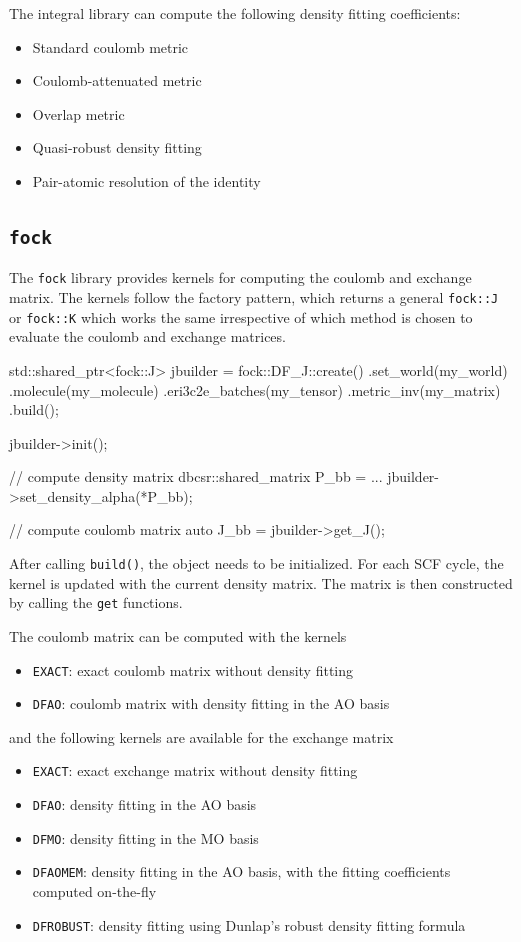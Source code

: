 The integral library can compute the following density fitting coefficients:
\begin{itemize}
\item Standard coulomb metric
\item Coulomb-attenuated metric
\item Overlap metric
\item Quasi-robust density fitting
\item Pair-atomic resolution of the identity
\end{itemize}

\subsection{\texttt{fock}}

The \texttt{fock} library provides kernels for computing the coulomb and exchange matrix. The kernels follow the factory pattern, which returns a general \texttt{fock::J} or \texttt{fock::K} which works the same irrespective of which method is chosen to evaluate the coulomb and exchange matrices.
\begin{cppinline}
std::shared_ptr<fock::J> 
jbuilder = fock::DF_J::create()
	.set_world(my_world)
	.molecule(my_molecule)
	.eri3c2e_batches(my_tensor)
	.metric_inv(my_matrix)
	.build();
	
jbuilder->init();

// compute density matrix 
dbcsr::shared_matrix P_bb = ...
jbuilder->set_density_alpha(*P_bb);

// compute coulomb matrix
auto J_bb = jbuilder->get_J();
\end{cppinline} 
\noindent After calling \texttt{build()}, the object needs to be initialized. For each SCF cycle, the kernel is updated with the current density matrix. The matrix is then constructed by calling the \texttt{get} functions.

The coulomb matrix can be computed with the kernels
\begin{itemize}
\item \texttt{EXACT}: exact coulomb matrix without density fitting
\item \texttt{DFAO}: coulomb matrix with density fitting in the AO basis
\end{itemize}
\noindent and the following kernels are available for the exchange matrix
\begin{itemize}
\item \texttt{EXACT}: exact exchange matrix without density fitting
\item \texttt{DFAO}: density fitting in the AO basis
\item \texttt{DFMO}: density fitting in the MO basis
\item \texttt{DFAOMEM}: density fitting in the AO basis, with the fitting coefficients computed on-the-fly
\item \texttt{DFROBUST}: density fitting using Dunlap's robust density fitting formula 
\end{itemize}

